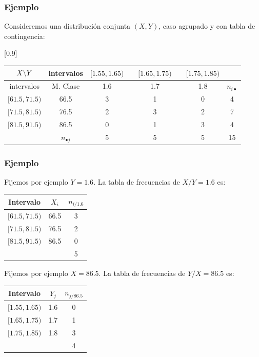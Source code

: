 \begin{frame}
\frametitle{Ejemplo}
Consideremos una distribución conjunta $(X,Y)$, caso agrupado y  con tabla de contingencia:
\begin{center}
\scalebox{0.90}[0.9]{
\begin{tabular}{|c|c|ccccc|c|}
\cline{1-7} $X  \mbox{\mbox{\textbackslash}}Y$ & intervalos & \multicolumn{1}{c}{$[1.55,1.65)$} &\vrule &
\multicolumn{1}{c}{$[1.65, 1.75)$} &\vrule &
 \multicolumn{1}{c|}{$[1.75, 1.85)$} &\multicolumn{1}{c}{}\\
\hline intervalos & M. Clase & \multicolumn{1}{c}{1.6} &\vrule & \multicolumn{1}{c}{1.7}
&\vrule & \multicolumn{1}{c|}{1.8} & $n_{i\bullet}$ \\
 \hline
$[61.5, 71.5)$ & 66.5 & 3 && 1 && 0 & 4 \\ $[71.5, 81.5)$ & 76.5 & 2 && 3 && 2 & 7 \\
$[81.5, 91.5)$ & 86.5 & 0 && 1 && 3 & 4 \\ \hline \multicolumn{1}{c|}{} & $n_{\bullet j}$
& 5 && 5 && 5 & 15 \\ \cline{2-8}
\end{tabular}
}
\end{center}
\end{frame}

\begin{frame}
\frametitle{Ejemplo}

Fijemos por ejemplo $Y=1.6$. La tabla de frecuencias de $X/Y=1.6$ es:
\begin{center}
\begin{tabular}{c|c|c}
Intervalo     &     $X_i$   &    $n_{i/1.6}$ \\ \hline $[61.5,71.5) $ & 66.5    & 3 \\
$[71.5,81.5) $   &  76.5    & 2 \\ $[81.5,91.5)$     & 86.5    & 0  \\ \hline
                &          &  5
\end{tabular}
\end{center}
\end{frame}

\begin{frame}
 Fijemos por ejemplo $X=86.5$. La tabla de frecuencias de $Y/X=86.5$ es:
\begin{center}
\begin{tabular}{c|c|c}
Intervalo   &      $Y_j$ &      $n_{j/86.5}$ \\ \hline $[1.55,1.65)$ & 1.6   &    0 \\
$[1.65,1.75)$  &     1.7   &    1 \\ $[1.75,1.85)$    &    1.8   &    3
\\ \hline
               &           &           4
\end{tabular}
\end{center}
\end{frame}

